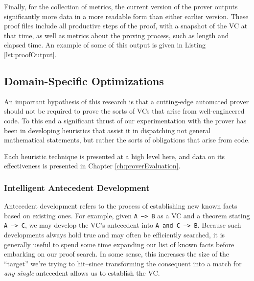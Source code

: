 Finally, for the collection of metrics, the current version of the prover outputs significantly more data in a more readable form than either earlier version.  These proof files include all productive steps of the proof, with a snapshot of the VC at that time, as well as metrics about the proving process, such as length and elapsed time.  An example of some of this output is given in Listing \ref{lst:proofOutput}.



	\subsection{Domain-Specific Optimizations\label{domainSpecific}}	%

An important hypothesis of this research is that a cutting-edge automated prover should not be required to prove the sorts of VCs that arise from well-engineered code.  To this end a significant thrust of our experimentation with the prover has been in developing heuristics that assist it in dispatching not general mathematical statements, but rather the sorts of obligations that arise from code.

Each heuristic technique is presented at a high level here, and data on its effectiveness is presented in Chapter \ref{ch:proverEvaluation}.

		\subsubsection{Intelligent Antecedent Development}

Antecedent development refers to the process of establishing new known facts based on existing ones.  For example, given \texttt{A ---> B} as a VC and a theorem stating \texttt{A ---> C}, we may develop the VC's antecedent into \texttt{A and C ---> B}.  Because such developments always hold true and may often be efficiently searched, it is generally useful to spend some time expanding our list of known facts before embarking on our proof search.  In some sense, this increases the size of the ``target'' we're trying to hit--since transforming the consequent into a match for \emph{any single} antecedent allows us to establish the VC.


